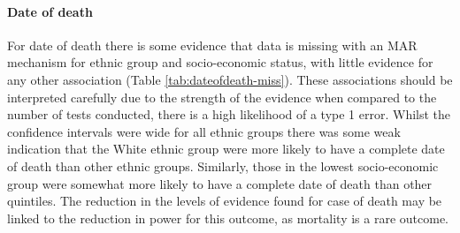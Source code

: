 \documentclass[11pt,twoside]{bristolthesis}
\begin{document}
  \hypertarget{date-of-death}{%
  \paragraph{Date of death}\label{date-of-death}}
  
  For date of death there is some evidence that data is missing with an MAR mechanism for ethnic group and socio-economic status, with little evidence for any other association (Table \ref{tab:dateofdeath-miss}). These associations should be interpreted carefully due to the strength of the evidence when compared to the number of tests conducted, there is a high likelihood of a type 1 error. Whilst the confidence intervals were wide for all ethnic groups there was some weak indication that the White ethnic group were more likely to have a complete date of death than other ethnic groups. Similarly, those in the lowest socio-economic group were somewhat more likely to have a complete date of death than other quintiles. The reduction in the levels of evidence found for case of death may be linked to the reduction in power for this outcome, as mortality is a rare outcome.
  
\end{document}
